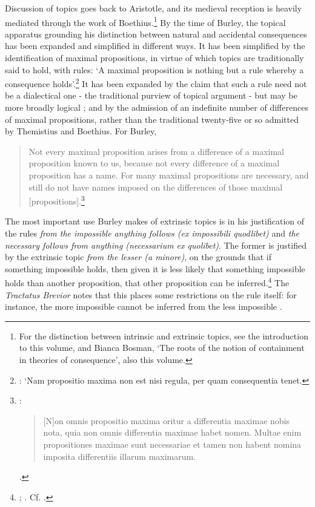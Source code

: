 \documentclass[]{birkjour}
\begin{document}
Discussion of topics goes back to Aristotle, and its medieval reception is heavily mediated through the work of Boethius.\footnote{For the distinction between intrinsic and extrinsic topics, see the introduction to this volume, and Bianca Bosman, `The roots of the notion of containment in theories of consequence', also this volume.} By the time of Burley, the topical apparatus grounding his distinction between natural and accidental consequences has been expanded and simplified in different ways. It has been simplified by the identification of maximal propositions, in virtue of which topics are traditionally said to hold, with rules: `A maximal proposition is nothing but a rule whereby a consequence holds'.\footnote{\autocite[p. 76.5-7]{BurleyDPAL}: `Nam propositio maxima non est nisi regula, per quam consequentia tenet.} It has been expanded by the claim that such a rule need not be a dialectical one - the traditional purview of topical argument - but may be more broadly logical \autocite[p. 76]{BurleyDPAL}; and by the admission of an indefinite number of differences of maximal propositions, rather than the traditional twenty-five or so admitted by Themistius and Boethius. For Burley,
\begin{quote}
	Not every maximal proposition arises from a difference of a maximal proposition known to us, because not every difference of a maximal proposition has a name. For many maximal propositions are necessary, and still do not have names imposed on the differences of those maximal [propositions].\footnote{\autocite[pp. 76.35-77.1]{BurleyDPAL}: \begin{quote}
			[N]on omnis propositio maxima oritur a differentia maximae nobis nota, quia non omnis differentia maximae habet nomen. Multae enim propositiones maximae sunt necessariae et tamen non habent nomina imposita differentiis illarum maximarum.
		\end{quote}.}
\end{quote}

The most important use Burley makes of extrinsic topics is in his justification of the rules \textit{from the impossible anything follows (ex impossibili quodlibet)} and \textit{the necessary follows from anything (necessarium ex quolibet)}. The former is justified by the extrinsic topic \textit{from the lesser (a minore)}, on the grounds that if something impossible holds, then given it is less likely that something impossible holds than another proposition, that other proposition can be inferred.\footnote{\autocite[pp. 128-129, par. 70]{Green-Pedersen1980b}; \autocite[p. 61]{BurleyDPAL}. Cf. \autocite[III-3. 38, pp. 727-731]{OckhamSL}.} The \textit{Tractatus Brevior} notes that this places some restrictions on the rule itself: for instance, the more impossible cannot be inferred from the less impossible \autocite[pp. 248.19-249.3]{BurleyDPAL}.
\end{document}
